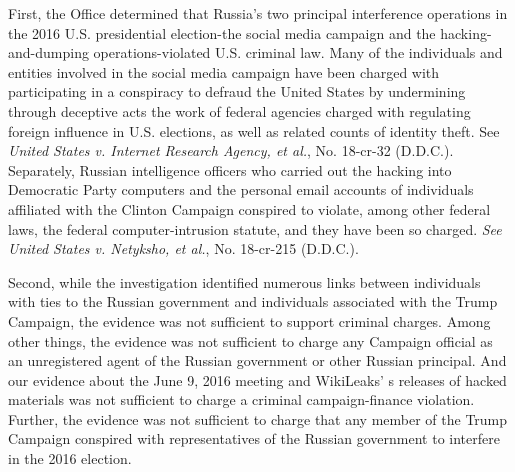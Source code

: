 \documentclass{article}
\begin{document}
First, the Office determined that Russia's two principal interference operations in the 2016 U.S. presidential election-the social media campaign and the hacking-and-dumping operations-violated U.S. criminal law. Many of the individuals and entities involved in the social media campaign have been charged with participating in a  conspiracy to defraud the United States by undermining through deceptive acts the work of federal agencies charged with regulating foreign influence in U.S. elections, as well as related counts of identity theft. See \textit{United States v. Internet Research Agency, et al.}, No. 18-cr-32 (D.D.C.).   Separately, Russian intelligence officers who carried out the hacking into Democratic Party computers and the personal email accounts of individuals affiliated with the Clinton Campaign conspired to violate,  among other federal laws, the federal computer-intrusion statute, and they have been so charged. \textit{See United States v. Netyksho, et al.}, No. 18-cr-215 (D.D.C.).


Second, while the investigation identified numerous links between individuals with ties to the Russian government and individuals associated with the Trump Campaign, the evidence was not sufficient to support criminal charges. Among other things, the evidence was not sufficient to charge any Campaign official as an unregistered agent of the Russian government or other Russian principal. And our evidence about the June 9, 2016 meeting and WikiLeaks' s releases of hacked materials was not sufficient to charge a criminal campaign-finance violation. Further, the evidence was not sufficient to charge that any member of the Trump Campaign conspired with representatives of the Russian government to interfere in the 2016 election.
\end{document}
